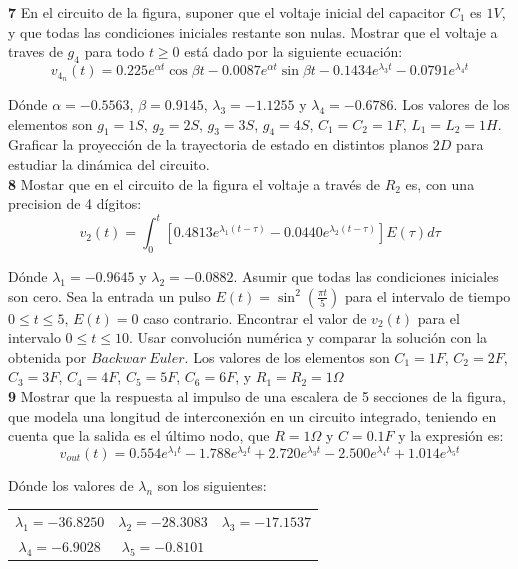 \documentclass[10pt,a4paper]{article} %
\begin{document}
	\textbf{7} En el circuito de la figura, suponer que el voltaje inicial del capacitor $C_1$ es $1V$, y que todas las condiciones iniciales restante son nulas. Mostrar que el voltaje a traves de $g_4$ para todo $t\geq 0$ está dado por la siguiente ecuación:
	\begin{equation}
		v_{4_n}(t)=0.225e^{\alpha t}\cos \beta t-0.0087e^{\alpha t}\sin \beta t-0.1434e^{\lambda_3 t}-0.0791e^{\lambda_4 t}
	\end{equation}
	
	Dónde $\alpha=-0.5563$, $\beta=0.9145$, $\lambda_3=-1.1255$ y $\lambda_4=-0.6786$. Los valores de los elementos son $g_1=1S$, $g_2=2S$, $g_3=3S$, $g_4=4S$, $C_1=C_2=1F$, $L_1=L_2=1H$. Graficar la proyección de la trayectoria de estado en distintos planos $2D$ para estudiar la dinámica del circuito.\\
	
	\textbf{8} Mostar que en el circuito de la figura el voltaje a través de $R_2$ es, con una precision de 4 dígitos:
	\begin{equation}
		v_2(t)=\int_{0}^{t}\left[0.4813e^{\lambda_1(t-\tau)}-0.0440e^{\lambda_2(t-\tau)}\right]E(\tau)d\tau
	\end{equation}
	
	Dónde $\lambda_1=-0.9645$ y $\lambda_2=-0.0882$. Asumir que todas las condiciones iniciales son cero. Sea la entrada un pulso $E(t)=\sin^2(\frac{\pi t}{5})$ para el intervalo de tiempo $0\leq t\leq 5$, $E(t)=0$ caso contrario. Encontrar el valor de $v_2(t)$ para el intervalo $0\leq t\leq 10$. Usar convolución numérica y comparar la solución con la obtenida por $Backwar\ Euler$. Los valores de los elementos son $C_1=1F$, $C_2=2F$, $C_3=3F$, $C_4=4F$, $C_5=5F$, $C_6=6F$, y $R_1=R_2=1\Omega$\\
	
	\textbf{9} Mostrar que la respuesta al impulso de una escalera de 5 secciones de la figura, que modela una longitud de interconexión en un circuito integrado, teniendo en cuenta que la salida es el último nodo, que $R=1\Omega$ y $C=0.1F$ y la expresión es:
	\begin{equation}
		v_{out}(t)=0.554e^{\lambda_1 t}-1.788e^{\lambda_2 t}+2.720e^{\lambda_3 t}-2.500e^{\lambda_4 t}+1.014e^{\lambda_5 t}
	\end{equation}
	
	Dónde los valores de $\lambda_n$ son los siguientes:
	\begin{center}
		\begin{tabular}{ccc}
			$\lambda_1=-36.8250$ & $\lambda_2=-28.3083$ & $\lambda_3=-17.1537$ \\ 
			$\lambda_4=-6.9028$ & $\lambda_5=-0.8101$ &  \\
		\end{tabular} 
	\end{center}
\end{document}
